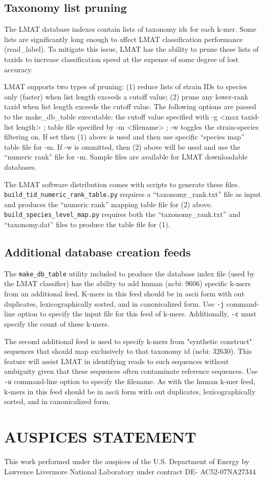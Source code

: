 \documentclass[11pt]{article}
\begin{document}
\subsection{Taxonomy list pruning}

The LMAT database indexes contain lists of taxonomy ids for each k-mer.  Some lists are significantly long enough to affect LMAT classification performance (read\_label).  To mitigate this issue, LMAT has the ability to prune these lists of taxids to increase classification speed at the expense of some degree of lost accuracy.

 LMAT supports two types of pruning: (1) reduce lists of strain IDs to species only (faster) when list length exceeds a cutoff value;  (2) prune any lower-rank taxid when list length exceeds the cutoff value.   The following options are passed to the make\_db\_table executable:
the cutoff value specified with -g <max taxid-list length> ;  table file specified by -m <filename> ; -w toggles the strain-species filtering on.  If set then (1) above is used and then use specific ``species map'' table file for -m.  If -w is ommitted, then (2) above will be used and use the ``numeric rank'' file for -m.  Sample files are available for LMAT downloadable databases.

The LMAT software distribution comes with scripts to generate these files.  \texttt{build_tid_numeric_rank_table.py} requires a ``taxonomy\_rank.txt'' file as input and produces the ``numeric rank'' mapping table file for (2) above.  \texttt{build\_species\_level\_map.py}  requires both the ``taxonomy\_rank.txt'' and  ``taxonomy.dat'' files to  produce the table file for (1).

\subsection{Additional database creation feeds}

The \texttt{make\_db\_table} utility included to produce the database index file (used by the LMAT classifier) has the ability to add human (ncbi: 9606) specific k-mers from an additional feed.  K-mers in this feed should be in ascii form with out duplicates, lexicographically sorted, and in canonicalized form.  Use \texttt{-j} command-line option to specify the input file for this feed of k-mers.  Additionally, \texttt{-c} must specify the count of these k-mers.

The second additional feed is used to specify k-mers from "synthetic construct" sequences that should map exclusively to that taxonomy id (ncbi: 32630).  This feature will assist LMAT in identifying reads to such sequences without ambiguity given that these sequences often contaminate reference sequences.  Use \texttt{-u} command-line option to specify the filename.  As with the human k-mer feed, k-mers in this feed should be in ascii form with out duplicates, lexicographically sorted, and in canonicalized form.



\section{AUSPICES STATEMENT}

This work performed under the auspices of the U.S. Department of
Energy by Lawrence Livermore National Laboratory under contract DE-
AC52-07NA27344
\end{document}
